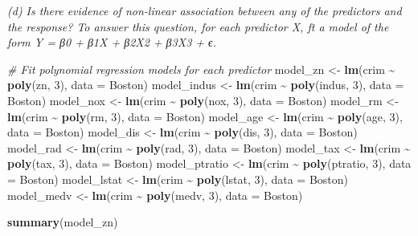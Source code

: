 \documentclass[
]{article}
\newenvironment{Shaded}{\begin{snugshade}}{\end{snugshade}}
\newcommand{\AttributeTok}[1]{\textcolor[rgb]{0.13,0.29,0.53}{#1}}
\newcommand{\CommentTok}[1]{\textcolor[rgb]{0.56,0.35,0.01}{\textit{#1}}}
\newcommand{\DecValTok}[1]{\textcolor[rgb]{0.00,0.00,0.81}{#1}}
\newcommand{\FunctionTok}[1]{\textcolor[rgb]{0.13,0.29,0.53}{\textbf{#1}}}
\newcommand{\NormalTok}[1]{#1}
\newcommand{\OtherTok}[1]{\textcolor[rgb]{0.56,0.35,0.01}{#1}}
\newcommand{\SpecialCharTok}[1]{\textcolor[rgb]{0.81,0.36,0.00}{\textbf{#1}}}
\begin{document}
\emph{(d) Is there evidence of non-linear association between any of the
predictors and the response? To answer this question, for each predictor
X, ft a model of the form Y = β0 + β1X + β2X2 + β3X3 + ϵ.}

\begin{Shaded}
\begin{Highlighting}[]
\CommentTok{\# Fit polynomial regression models for each predictor}
\NormalTok{model\_zn }\OtherTok{\textless{}{-}} \FunctionTok{lm}\NormalTok{(crim }\SpecialCharTok{\textasciitilde{}} \FunctionTok{poly}\NormalTok{(zn, }\DecValTok{3}\NormalTok{), }\AttributeTok{data =}\NormalTok{ Boston)}
\NormalTok{model\_indus }\OtherTok{\textless{}{-}} \FunctionTok{lm}\NormalTok{(crim }\SpecialCharTok{\textasciitilde{}} \FunctionTok{poly}\NormalTok{(indus, }\DecValTok{3}\NormalTok{), }\AttributeTok{data =}\NormalTok{ Boston)}
\NormalTok{model\_nox }\OtherTok{\textless{}{-}} \FunctionTok{lm}\NormalTok{(crim }\SpecialCharTok{\textasciitilde{}} \FunctionTok{poly}\NormalTok{(nox, }\DecValTok{3}\NormalTok{), }\AttributeTok{data =}\NormalTok{ Boston)}
\NormalTok{model\_rm }\OtherTok{\textless{}{-}} \FunctionTok{lm}\NormalTok{(crim }\SpecialCharTok{\textasciitilde{}} \FunctionTok{poly}\NormalTok{(rm, }\DecValTok{3}\NormalTok{), }\AttributeTok{data =}\NormalTok{ Boston)}
\NormalTok{model\_age }\OtherTok{\textless{}{-}} \FunctionTok{lm}\NormalTok{(crim }\SpecialCharTok{\textasciitilde{}} \FunctionTok{poly}\NormalTok{(age, }\DecValTok{3}\NormalTok{), }\AttributeTok{data =}\NormalTok{ Boston)}
\NormalTok{model\_dis }\OtherTok{\textless{}{-}} \FunctionTok{lm}\NormalTok{(crim }\SpecialCharTok{\textasciitilde{}} \FunctionTok{poly}\NormalTok{(dis, }\DecValTok{3}\NormalTok{), }\AttributeTok{data =}\NormalTok{ Boston)}
\NormalTok{model\_rad }\OtherTok{\textless{}{-}} \FunctionTok{lm}\NormalTok{(crim }\SpecialCharTok{\textasciitilde{}} \FunctionTok{poly}\NormalTok{(rad, }\DecValTok{3}\NormalTok{), }\AttributeTok{data =}\NormalTok{ Boston)}
\NormalTok{model\_tax }\OtherTok{\textless{}{-}} \FunctionTok{lm}\NormalTok{(crim }\SpecialCharTok{\textasciitilde{}} \FunctionTok{poly}\NormalTok{(tax, }\DecValTok{3}\NormalTok{), }\AttributeTok{data =}\NormalTok{ Boston)}
\NormalTok{model\_ptratio }\OtherTok{\textless{}{-}} \FunctionTok{lm}\NormalTok{(crim }\SpecialCharTok{\textasciitilde{}} \FunctionTok{poly}\NormalTok{(ptratio, }\DecValTok{3}\NormalTok{), }\AttributeTok{data =}\NormalTok{ Boston)}
\NormalTok{model\_lstat }\OtherTok{\textless{}{-}} \FunctionTok{lm}\NormalTok{(crim }\SpecialCharTok{\textasciitilde{}} \FunctionTok{poly}\NormalTok{(lstat, }\DecValTok{3}\NormalTok{), }\AttributeTok{data =}\NormalTok{ Boston)}
\NormalTok{model\_medv }\OtherTok{\textless{}{-}} \FunctionTok{lm}\NormalTok{(crim }\SpecialCharTok{\textasciitilde{}} \FunctionTok{poly}\NormalTok{(medv, }\DecValTok{3}\NormalTok{), }\AttributeTok{data =}\NormalTok{ Boston)}

\FunctionTok{summary}\NormalTok{(model\_zn)}
\end{Highlighting}
\end{Shaded}
\end{document}
